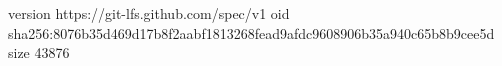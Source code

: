 version https://git-lfs.github.com/spec/v1
oid sha256:8076b35d469d17b8f2aabf1813268fead9afdc9608906b35a940c65b8b9cee5d
size 43876
